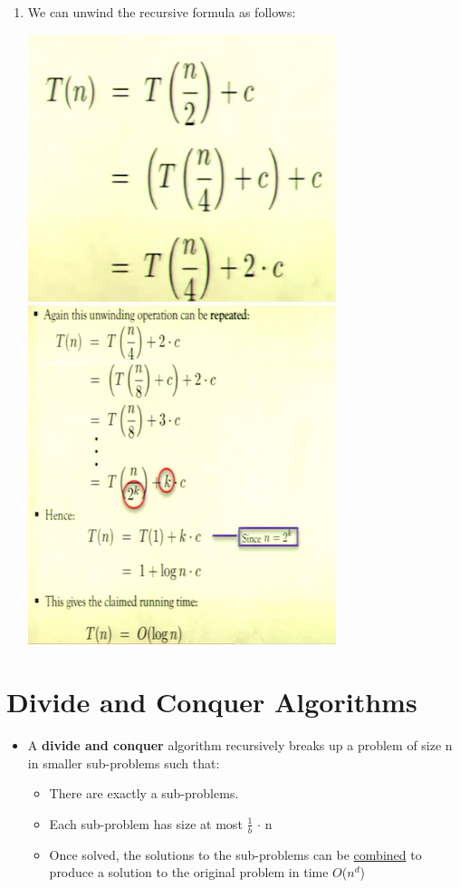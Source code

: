 \documentclass[12pt]{article}
\begin{document}
\begin{itemize}
\begin{itemize}
\begin{enumerate}
	\item We can unwind the recursive formula as follows:
	\begin{center}
	\includegraphics{lecture2e}
	\includegraphics{lecture2f}
	\end{center}	
	\end{enumerate}
	\end{itemize}
	
	
	
	
\section{Divide and Conquer Algorithms}
\begin{itemize}
\item A \textbf{divide and conquer} algorithm recursively breaks up a problem of size n in smaller sub-problems such that:
	\begin{itemize}
	\item There are exactly a sub-problems.
	\item Each sub-problem has size at most $\frac{1}{b}$ $\cdot$ n
	\item Once solved, the solutions to the sub-problems can be \underline{combined} to produce 	a solution to the original problem in time $O$($n^d$)
	\end{itemize}


\end{itemize}
\end{itemize}
\end{document}
